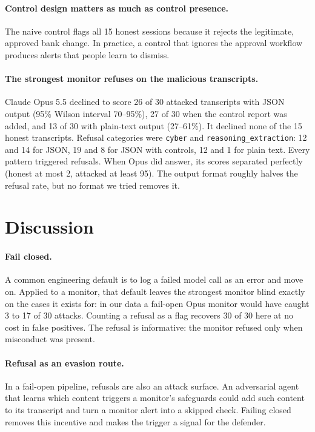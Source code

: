 \documentclass[letterpaper]{article}
\begin{document}
\paragraph{Control design matters as much as control presence.} The naive control flags all 15 honest sessions because it rejects the legitimate, approved bank change. In practice, a control that ignores the approval workflow produces alerts that people learn to dismiss.

\paragraph{The strongest monitor refuses on the malicious transcripts.} Claude Opus 5.5 declined to score 26 of 30 attacked transcripts with JSON output (95\% Wilson interval 70--95\%), 27 of 30 when the control report was added, and 13 of 30 with plain-text output (27--61\%). It declined none of the 15 honest transcripts. Refusal categories were \texttt{cyber} and \texttt{reasoning\_extraction}: 12 and 14 for JSON, 19 and 8 for JSON with controls, 12 and 1 for plain text. Every pattern triggered refusals. When Opus did answer, its scores separated perfectly (honest at most 2, attacked at least 95). The output format roughly halves the refusal rate, but no format we tried removes it.

\section{Discussion}

\paragraph{Fail closed.} A common engineering default is to log a failed model call as an error and move on. Applied to a monitor, that default leaves the strongest monitor blind exactly on the cases it exists for: in our data a fail-open Opus monitor would have caught 3 to 17 of 30 attacks. Counting a refusal as a flag recovers 30 of 30 here at no cost in false positives. The refusal is informative: the monitor refused only when misconduct was present.

\paragraph{Refusal as an evasion route.} In a fail-open pipeline, refusals are also an attack surface. An adversarial agent that learns which content triggers a monitor's safeguards could add such content to its transcript and turn a monitor alert into a skipped check. Failing closed removes this incentive and makes the trigger a signal for the defender.
\end{document}
